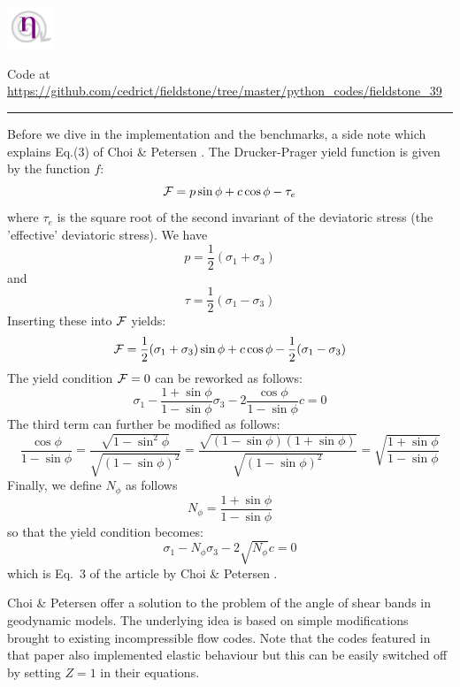 
\includegraphics[height=1.25cm]{images/pictograms/nonlinear}



\begin{center}
Code at \url{https://github.com/cedrict/fieldstone/tree/master/python_codes/fieldstone_39}
\end{center}

\par\noindent\rule{\textwidth}{0.4pt}

Before we dive in the implementation and the benchmarks, a side note which explains Eq.(3) 
of 
Choi \& Petersen \cite{chpe15}.
The Drucker-Prager yield function is given by the function $f$:
\[
{\cal F} = p \sin\phi + c\cos \phi - \tau_e
\]
where $\tau_e$ is the square root of the second invariant of the deviatoric stress
(the 'effective' deviatoric stress).
We have
\[
p=\frac{1}{2}(\sigma_1+\sigma_3) 
\]
and 
\[
\tau = \frac{1}{2}(\sigma_1-\sigma_3)
\]
Inserting these into ${\cal F}$ yields:
\[
{\cal F}= \frac{1}{2}(\sigma_1+\sigma_3) \sin\phi + c \cos\phi - \frac{1}{2}(\sigma_1-\sigma_3)
\]
The yield condition ${\cal F}=0$ can be reworked as follows:
\[
\sigma_1 - \frac{1 + \sin\phi}{1-\sin\phi} \sigma_3 - 2 \frac{\cos \phi}{1-\sin\phi} c = 0
\]
The third term can further be modified as follows:
\[
\frac{\cos \phi}{1-\sin\phi}
=\frac{\sqrt{1-\sin^2 \phi}}{\sqrt{(1-\sin\phi)^2}}
=\frac{\sqrt{(1-\sin \phi)(1+\sin\phi)}}{\sqrt{(1-\sin\phi)^2}}
=\sqrt{
\frac{1+\sin\phi}{1-\sin\phi}
}
\]
Finally, we define $N_\phi$ as follows 
\[
N_\phi=\frac{1+\sin \phi}{1-\sin\phi}
\]
so that the yield condition becomes:
\[
\sigma_1 - N_\phi \sigma_3 - 2 \sqrt{N_\phi} c = 0
\]
which is Eq.~3 of the article by Choi \& Petersen \cite{chpe15}.

\vspace{1cm}

Choi \& Petersen offer a solution to the problem of the angle of shear bands in 
geodynamic models. The underlying idea is based on simple modifications 
brought to existing incompressible flow codes. Note that the codes
featured in that paper also implemented elastic behaviour but this can 
be easily switched off by setting $Z=1$ in their equations.


